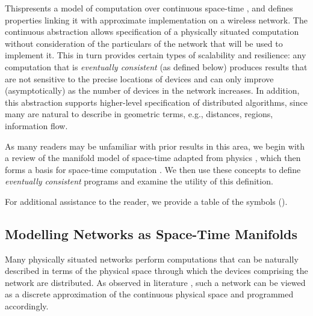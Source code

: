 \documentclass[12pt,a4paper,twoside,openright]{book}
\begin{document}
This\levelText{}presents a model of computation over continuous space-time \cite{bealBasisSCW10,BVD-SCW14,BealUsbeck12}, and defines properties linking it with approximate implementation on a wireless network.
%
The continuous abstraction allows specification of a physically situated computation without consideration of the particulars of the network that will be used to implement it.
%
This in turn provides certain types of scalability and resilience: any computation that is {\em eventually consistent} (as defined below) produces results that are not sensitive to the precise locations of devices and can only improve (asymptotically) as the number of devices in the network increases.
%
In addition, this abstraction supports higher-level specification of distributed algorithms, since many are natural to describe in geometric terms, e.g., distances, regions, information flow.

As many readers may be unfamiliar with prior results in this area, we begin with a review of the manifold model of space-time adapted from physics \cite{upp,bealBasisSCW10}, which then forms a basis for space-time computation \cite{bealBasisSCW10,BVD-SCW14,BealUsbeck12}.
%
We then use these concepts to define {\em eventually consistent} programs and examine the utility of this definition.

For additional assistance to the reader, we provide a table of the symbols ().


\subsection{Modelling Networks as Space-Time Manifolds}

Many physically situated networks perform computations that can be naturally described in terms of the physical space through which the devices comprising the network are distributed.
%
As observed in literature \cite{upp,bealBasisSCW10}, such a network can be viewed as a discrete approximation of the continuous physical space and programmed accordingly.
\end{document}
